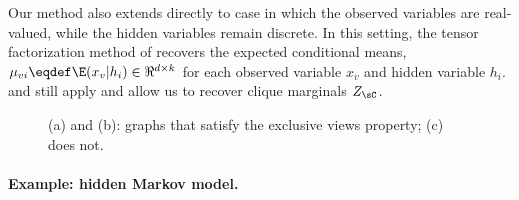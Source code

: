 Our method also extends directly to case in which the observed variables
  are real-valued, while the hidden variables remain discrete. 
In this setting, the tensor factorization method of
  \citet{anandkumar13tensor} recovers the expected conditional means,
  $\mu_{vi} \eqdef \E(x_v | h_i) \in \Re^{d \times k}$ for each observed variable $x_v$ and
  hidden variable $h_i$.
 and  still apply and allow
  us to recover clique marginals $Z_\sC$.

\begin{figure}
  \centering
  \caption{(a) and (b): graphs that satisfy the exclusive views property; (c) does not.}
  \label{fig:examples}
\end{figure}


\paragraph{Example: hidden Markov model.}

